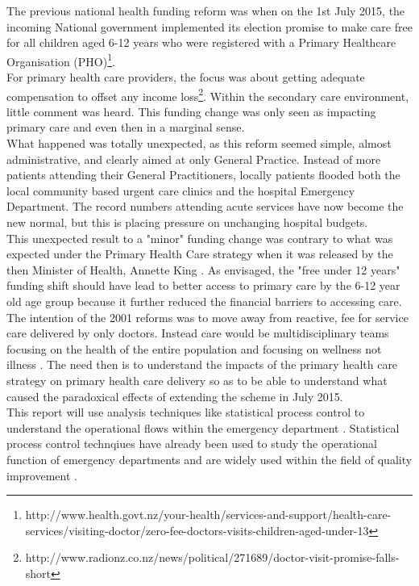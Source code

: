 \documentclass[11pt,a4paper]{article}
\begin{document}
The previous national health funding reform was when on the 1st July 2015, the incoming National government implemented its election promise to make care free for all children aged 6-12 years who were registered with a Primary Healthcare Organisation (PHO)\footnote{http://www.health.govt.nz/your-health/services-and-support/health-care-services/visiting-doctor/zero-fee-doctors-visits-children-aged-under-13}.\\

For primary health care providers, the focus was about getting adequate compensation to offset any income loss\footnote{http://www.radionz.co.nz/news/political/271689/doctor-visit-promise-falls-short}. Within the secondary care environment, little comment was heard. This funding change was only seen as impacting primary care and even then in a marginal sense.\\

What happened was totally unexpected, as this reform seemed simple, almost administrative, and clearly aimed at only General Practice. Instead of more patients  attending their General Practitioners, locally patients flooded both the local community based urgent care clinics and the hospital Emergency Department. The record numbers attending acute services have now become the new normal, but this is placing pressure on unchanging hospital budgets. \\

This unexpected result to a "minor" funding change was contrary to what was expected under the Primary Health Care strategy when it was released by the then Minister of Health, Annette King \citep{king2001primary}. As envisaged, the "free under 12 years" funding shift should have lead to better access to primary care by the 6-12 year old age group because it further reduced the financial barriers to accessing care. The intention of the 2001 reforms was to move away from reactive, fee for service care delivered by only doctors. Instead care would be multidisciplinary teams focusing on the health of the entire population and focusing on wellness not illness \citep{king2001primary}.  The need then is to understand the impacts of the primary health care strategy on primary health care delivery so as to be able to understand what caused the paradoxical effects of extending the scheme in July 2015.\\

This report will use analysis techniques like statistical process control to understand the operational flows within the emergency department \citep{rosemann2015six, cheng2015run, epprecht2015statistical}. Statistical process control technqiues have already been used to study the operational function of emergency departments \citep{pimentel2015statistical} and are widely used within the field of quality improvement \citep{provost2011health}.\\
\end{document}
